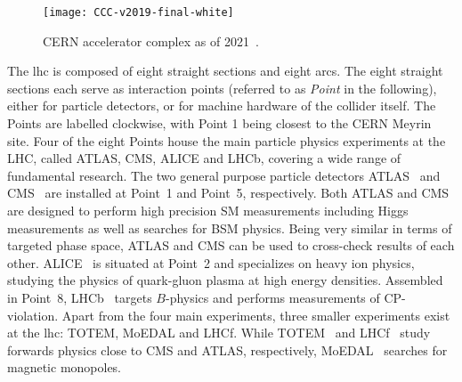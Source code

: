 \begin{figure}
	\centering    
	\texttt{[image: CCC-v2019-final-white]}
	\caption[CERN accelerator complex]{CERN accelerator complex as of 2021~\cite{Mobs:2684277}.}
	\label{fig:accelerator_complex}
\end{figure}

The \gls{lhc} is composed of eight straight sections and eight arcs. The eight straight sections each serve as interaction points (referred to as \textit{Point} in the following), either for particle detectors, or for machine hardware of the collider itself. The Points are labelled clockwise, with Point 1 being closest to the CERN Meyrin site. Four of the eight Points house the main particle physics experiments at the LHC, called ATLAS, CMS, ALICE and LHCb, covering a wide range of fundamental research. The two general purpose particle detectors ATLAS~\cite{Aad:2008zzm} and CMS~\cite{Chatrchyan:2008aa} are installed at Point~1 and Point~5, respectively. Both ATLAS and CMS are designed to perform high precision SM measurements including Higgs measurements as well as searches for BSM physics. Being very similar in terms of targeted phase space, ATLAS and CMS can be used to cross-check results of each other. ALICE~\cite{Aamodt:2008zz} is situated at Point~2 and specializes on heavy ion physics, studying the physics of quark-gluon plasma at high energy densities. Assembled in Point~8, LHCb~\cite{Alves:2008zz} targets $B$-physics and performs measurements of CP-violation. Apart from the four main experiments, three smaller experiments exist at the \gls{lhc}: TOTEM, MoEDAL and LHCf. While TOTEM~\cite{Anelli:2008zza} and LHCf~\cite{Adriani:2006jd} study forwards physics close to CMS and ATLAS, respectively, MoEDAL~\cite{Pinfold:2009oia} searches for magnetic monopoles.

